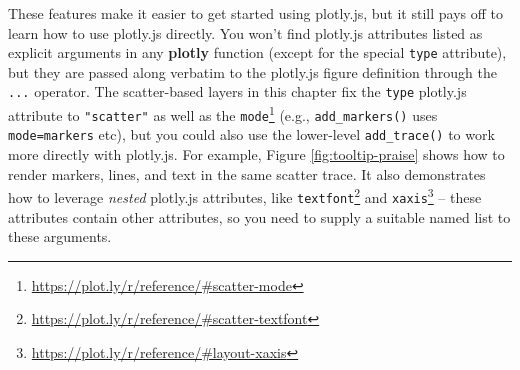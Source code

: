 \documentclass[
  12pt,
]{krantz}
\newenvironment{Shaded}{\begin{snugshade}}{\end{snugshade}}
\newcommand{\DataTypeTok}[1]{\textcolor[rgb]{0.13,0.29,0.53}{#1}}
\newcommand{\DecValTok}[1]{\textcolor[rgb]{0.00,0.00,0.81}{#1}}
\newcommand{\KeywordTok}[1]{\textcolor[rgb]{0.13,0.29,0.53}{\textbf{#1}}}
\newcommand{\NormalTok}[1]{#1}
\newcommand{\OperatorTok}[1]{\textcolor[rgb]{0.81,0.36,0.00}{\textbf{#1}}}
\newcommand{\StringTok}[1]{\textcolor[rgb]{0.31,0.60,0.02}{#1}}
\renewcommand{\href}[2]{#2\footnote{\url{#1}}}
\begin{document}

These features make it easier to get started using plotly.js, but it still pays off to learn how to use plotly.js directly. You won't find plotly.js attributes listed as explicit arguments in any \textbf{plotly} function (except for the special \texttt{type} attribute), but they are passed along verbatim to the plotly.js figure definition through the \texttt{...} operator. The scatter-based layers in this chapter fix the \texttt{type} plotly.js attribute to \texttt{"scatter"} as well as the \href{https://plot.ly/r/reference/\#scatter-mode}{\texttt{mode}} (e.g., \texttt{add\_markers()} uses \texttt{mode=\textquotesingle{}markers\textquotesingle{}} etc), but you could also use the lower-level \texttt{add\_trace()} to work more directly with plotly.js. For example, Figure \ref{fig:tooltip-praise} shows how to render markers, lines, and text in the same scatter trace. It also demonstrates how to leverage \emph{nested} plotly.js attributes, like \href{https://plot.ly/r/reference/\#scatter-textfont}{\texttt{textfont}} and \href{https://plot.ly/r/reference/\#layout-xaxis}{\texttt{xaxis}} -- these attributes contain other attributes, so you need to supply a suitable named list to these arguments.

\begin{Shaded}
\end{Shaded}
\end{document}
